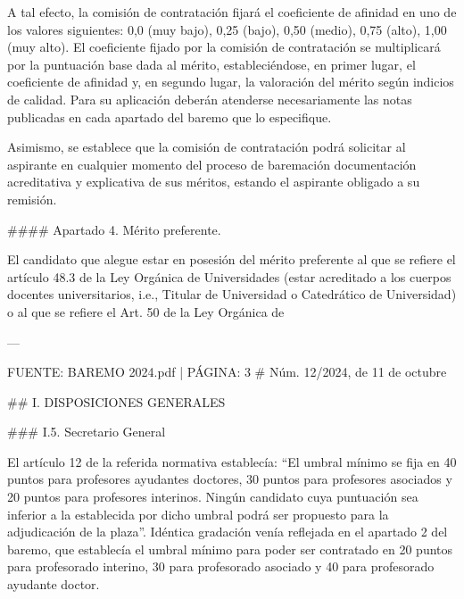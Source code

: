 \documentclass{article}
\begin{document}
\begin{itemize}
\begin{itemize}
\begin{scriptsize}
                  A tal efecto, la comisión de contratación fijará el coeficiente de afinidad en uno de los valores siguientes: 0,0 (muy bajo), 0,25 (bajo), 0,50 (medio), 0,75 (alto), 1,00 (muy alto). El coeficiente fijado por la comisión de contratación se multiplicará por la puntuación base dada al mérito, estableciéndose, en primer lugar, el coeficiente de afinidad y, en segundo lugar, la valoración del mérito según indicios de calidad. Para su aplicación deberán atenderse necesariamente las notas publicadas en cada apartado del baremo que lo especifique.

                  Asimismo, se establece que la comisión de contratación podrá solicitar al aspirante en cualquier momento del proceso de baremación documentación acreditativa y explicativa de sus méritos, estando el aspirante obligado a su remisión.

                  \#\#\#\# Apartado 4. Mérito preferente.

                  El candidato que alegue estar en posesión del mérito preferente al que se refiere el artículo 48.3 de la Ley Orgánica de Universidades (estar acreditado a los cuerpos docentes universitarios, i.e., Titular de Universidad o Catedrático de Universidad) o al que se refiere el Art. 50 de la Ley Orgánica de

                  ---

                  FUENTE: BAREMO 2024.pdf | PÁGINA: 3
                  \# Núm. 12/2024, de 11 de octubre

                  \#\# I. DISPOSICIONES GENERALES

                  \#\#\# I.5. Secretario General

                  El artículo 12 de la referida normativa establecía: “El umbral mínimo se fija en 40 puntos para profesores ayudantes doctores, 30 puntos para profesores asociados y 20 puntos para profesores interinos. Ningún candidato cuya puntuación sea inferior a la establecida por dicho umbral podrá ser propuesto para la adjudicación de la plaza”. Idéntica gradación venía reflejada en el apartado 2 del baremo, que establecía el umbral mínimo para poder ser contratado en 20 puntos para profesorado interino, 30 para profesorado asociado y 40 para profesorado ayudante doctor.


\end{scriptsize}
\end{itemize}
\end{itemize}
\end{document}
